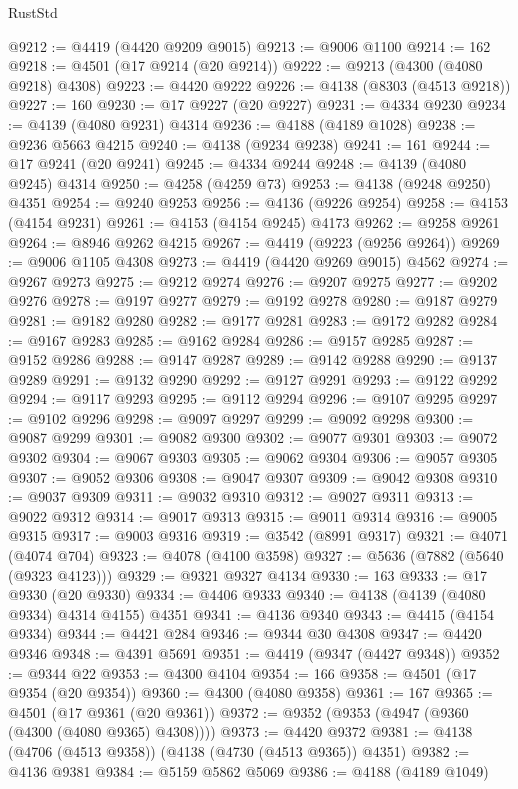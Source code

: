 \begin{lexlean}{RustStd}
\begin{coremodule}
@9212 := @4419 (@4420 @9209 @9015)
@9213 := @9006 @1100
@9214 := 162
@9218 := @4501 (@17 @9214 (@20 @9214))
@9222 := @9213 (@4300 (@4080 @9218) @4308)
@9223 := @4420 @9222
@9226 := @4138 (@8303 (@4513 @9218))
@9227 := 160
@9230 := @17 @9227 (@20 @9227)
@9231 := @4334 @9230
@9234 := @4139 (@4080 @9231) @4314
@9236 := @4188 (@4189 @1028)
@9238 := @9236 @5663 @4215
@9240 := @4138 (@9234 @9238)
@9241 := 161
@9244 := @17 @9241 (@20 @9241)
@9245 := @4334 @9244
@9248 := @4139 (@4080 @9245) @4314
@9250 := @4258 (@4259 @73)
@9253 := @4138 (@9248 @9250) @4351
@9254 := @9240 @9253
@9256 := @4136 (@9226 @9254)
@9258 := @4153 (@4154 @9231)
@9261 := @4153 (@4154 @9245) @4173
@9262 := @9258 @9261
@9264 := @8946 @9262 @4215
@9267 := @4419 (@9223 (@9256 @9264))
@9269 := @9006 @1105 @4308
@9273 := @4419 (@4420 @9269 @9015) @4562
@9274 := @9267 @9273
@9275 := @9212 @9274
@9276 := @9207 @9275
@9277 := @9202 @9276
@9278 := @9197 @9277
@9279 := @9192 @9278
@9280 := @9187 @9279
@9281 := @9182 @9280
@9282 := @9177 @9281
@9283 := @9172 @9282
@9284 := @9167 @9283
@9285 := @9162 @9284
@9286 := @9157 @9285
@9287 := @9152 @9286
@9288 := @9147 @9287
@9289 := @9142 @9288
@9290 := @9137 @9289
@9291 := @9132 @9290
@9292 := @9127 @9291
@9293 := @9122 @9292
@9294 := @9117 @9293
@9295 := @9112 @9294
@9296 := @9107 @9295
@9297 := @9102 @9296
@9298 := @9097 @9297
@9299 := @9092 @9298
@9300 := @9087 @9299
@9301 := @9082 @9300
@9302 := @9077 @9301
@9303 := @9072 @9302
@9304 := @9067 @9303
@9305 := @9062 @9304
@9306 := @9057 @9305
@9307 := @9052 @9306
@9308 := @9047 @9307
@9309 := @9042 @9308
@9310 := @9037 @9309
@9311 := @9032 @9310
@9312 := @9027 @9311
@9313 := @9022 @9312
@9314 := @9017 @9313
@9315 := @9011 @9314
@9316 := @9005 @9315
@9317 := @9003 @9316
@9319 := @3542 (@8991 @9317)
@9321 := @4071 (@4074 @704)
@9323 := @4078 (@4100 @3598)
@9327 := @5636 (@7882 (@5640 (@9323 @4123)))
@9329 := @9321 @9327 @4134
@9330 := 163
@9333 := @17 @9330 (@20 @9330)
@9334 := @4406 @9333
@9340 := @4138 (@4139 (@4080 @9334) @4314 @4155) @4351
@9341 := @4136 @9340
@9343 := @4415 (@4154 @9334)
@9344 := @4421 @284
@9346 := @9344 @30 @4308
@9347 := @4420 @9346
@9348 := @4391 @5691
@9351 := @4419 (@9347 (@4427 @9348))
@9352 := @9344 @22
@9353 := @4300 @4104
@9354 := 166
@9358 := @4501 (@17 @9354 (@20 @9354))
@9360 := @4300 (@4080 @9358)
@9361 := 167
@9365 := @4501 (@17 @9361 (@20 @9361))
@9372 := @9352 (@9353 (@4947 (@9360 (@4300 (@4080 @9365) @4308))))
@9373 := @4420 @9372
@9381 := @4138 (@4706 (@4513 @9358)) (@4138 (@4730 (@4513 @9365)) @4351)
@9382 := @4136 @9381
@9384 := @5159 @5862 @5069
@9386 := @4188 (@4189 @1049)

\end{coremodule}
\end{lexlean}
